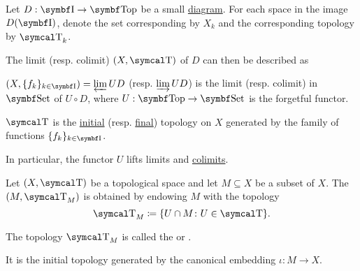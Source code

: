 \begin{Proposition}\label{thm:initial_final_topology_limit}\cite{nLab:top}
  Let \( D: \Bold I \to \Cat{Top} \) be a small \hyperref[def:categorical_diagram]{diagram}. For each space in the image \( D(\Bold I) \), denote the set corresponding by \( X_k \) and the corresponding topology by \( \CT_k \).

  The limit (resp. colimit) \( (X, \CT) \) of \( D \) can then be described as
  \begin{DefEnum}
    \item \( (X, \{ f_k \}_{k \in \Cat{I}}) = \varprojlim UD \) (resp. \( \varinjlim UD \)) is the limit (resp. colimit) in \( \Cat{Set} \) of \( U \circ D \), where \( U: \Bold{Top} \to \Cat{Set} \) is the forgetful functor.
    \item \( \CT \) is the \hyperref[def:initial_topology]{initial} (resp. \hyperref[def:final_topology]{final}) topology on \( X \) generated by the family of functions \( \{ f_k \}_{k \in \Cat{I}} \).
  \end{DefEnum}

  In particular, the functor \( U \) lifts limits and \hyperref[def:categorical_limit_preservation/lift]{colimits}.
\end{Proposition}

\begin{Definition}\label{def:topological_subspace}
  Let \( (X, \CT) \) be a topological space and let \( M \subseteq X \) be a subset of \( X \). The  \( (M, \CT_M) \) is obtained by endowing \( M \) with the topology
  \begin{equation*}
    \CT_M \coloneqq \{ U \cap M \colon U \in \CT \}.
  \end{equation*}

  The topology \( \CT_M \) is called the  or .

  It is the initial topology generated by the canonical embedding \( \iota: M \to X \).
\end{Definition}

